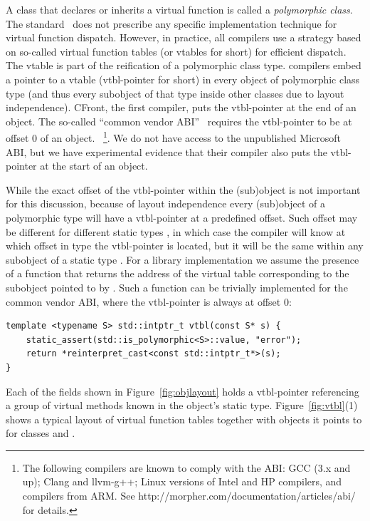A class that declares or inherits a virtual function is called a 
\emph{polymorphic class}. The \Cpp{} standard~\cite{C++11} does not prescribe any 
specific implementation technique for virtual function dispatch.
However, in practice, all \Cpp{} compilers use a strategy based on so-called
virtual function tables (or vtables for short) for efficient dispatch. 
The vtable is part of the reification of a polymorphic class type.  
\Cpp{} compilers embed a pointer to a vtable (vtbl-pointer for short) in every object of
polymorphic class type (and thus every subobject of that type inside other 
classes due to layout independence). CFront, the first \Cpp{} compiler, puts the 
vtbl-pointer 
at the end of an object. The so-called ``common vendor \Cpp{} ABI''~\cite{C++ABI} requires the 
vtbl-pointer to be at offset 0 of an object. ~\footnote{The following compilers 
are known to comply with the \Cpp{} ABI: GCC (3.x and up); Clang and llvm-g++; 
Linux versions of Intel and HP compilers, and compilers from ARM. See 
http://morpher.com/documentation/articles/abi/ for details.}. 
We do not have 
access to the unpublished Microsoft ABI, but we have experimental evidence that 
their \Cpp{} compiler also puts the vtbl-pointer at the start of an object.

While the exact offset of the vtbl-pointer within the (sub)object is not important 
for this discussion, because of layout independence every (sub)object of a 
polymorphic type  will have a vtbl-pointer at a predefined offset. 
Such offset may be different for different static types , in which case 
the compiler will know at which offset in type  the vtbl-pointer is 
located, but it will be the same within any subobject of a static type 
. For a library implementation we assume the presence of a function 
that returns the address of the virtual table corresponding to the subobject 
pointed to by . Such a function can be trivially implemented for the 
common vendor \Cpp{} ABI, where the vtbl-pointer is always at offset 0:

\begin{lstlisting}
template <typename S> std::intptr_t vtbl(const S* s) {
    static_assert(std::is_polymorphic<S>::value, "error");
    return *reinterpret_cast<const std::intptr_t*>(s);
}
\end{lstlisting}

\noindent
Each of the  fields shown in Figure~\ref{fig:objlayout} holds a 
vtbl-pointer referencing a group of virtual methods known in the object's static 
type. Figure~\ref{fig:vtbl}(1) shows a typical layout of virtual function tables 
together with objects it points to for classes  and .

